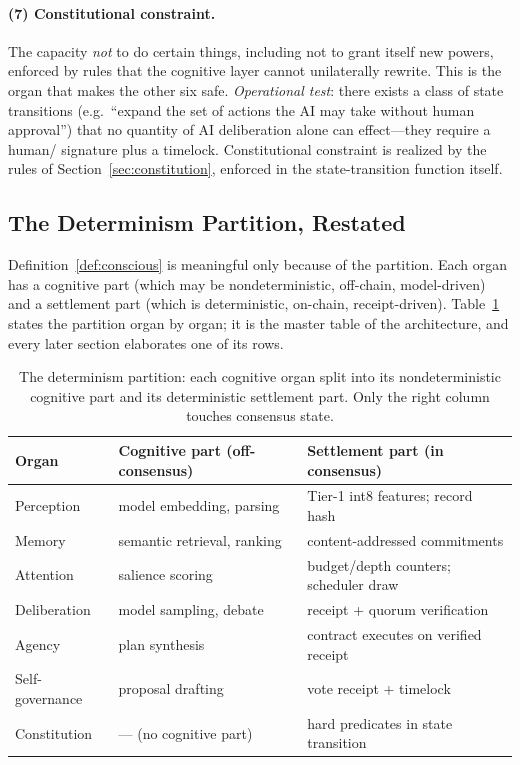 \paragraph{(7) Constitutional constraint.} The capacity \emph{not} to do certain things, including not to grant itself new powers, enforced by rules that the cognitive layer cannot unilaterally rewrite. This is the organ that makes the other six safe. \emph{Operational test}: there exists a class of state transitions (e.g.\ ``expand the set of actions the AI may take without human approval'') that no quantity of AI deliberation alone can effect---they require a human/\DAO{} signature plus a timelock. Constitutional constraint is realized by the rules of Section~\ref{sec:constitution}, enforced in the state-transition function itself.

\subsection{The Determinism Partition, Restated}

Definition~\ref{def:conscious} is meaningful only because of the partition. Each organ has a cognitive part (which may be nondeterministic, off-chain, model-driven) and a settlement part (which is deterministic, on-chain, receipt-driven). Table~\ref{tab:partition} states the partition organ by organ; it is the master table of the architecture, and every later section elaborates one of its rows.

\begin{table}[h]
\centering
\caption{The determinism partition: each cognitive organ split into its nondeterministic cognitive part and its deterministic settlement part. Only the right column touches consensus state.}
\label{tab:partition}
\small
\begin{tabular}{@{}lll@{}}
\toprule
Organ & Cognitive part (off-consensus) & Settlement part (in consensus) \\
\midrule
Perception & model embedding, parsing & Tier-1 int8 features; \SChain{} record hash \\
Memory & semantic retrieval, ranking & \MChain{} content-addressed commitments \\
Attention & salience scoring & budget/depth counters; scheduler draw \\
Deliberation & model sampling, debate & \PoT{} receipt + quorum verification \\
Agency & plan synthesis & contract executes on verified receipt \\
Self-governance & proposal drafting & \GChain{} vote receipt + timelock \\
Constitution & --- (no cognitive part) & hard predicates in state transition \\
\bottomrule
\end{tabular}
\end{table}

